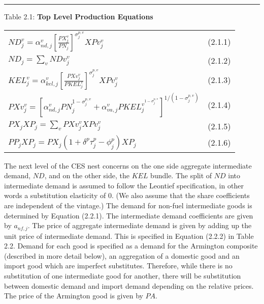 \documentclass{article}
\begin{document}
\noindent\rule{\linewidth}{0.4pt}
\begin{center}
\begin{large}

{\centering Table 2.1: \textbf{Top Level Production Equations} \par}

\begin{tabular}{>{\raggedright}p{} l}

    $N\!D_j^v=\alpha^v_{nd,j}\left[\frac{P\!X_j^v}{P\!N_j}\right]^{\sigma^{p,v}_j} X\!Pv^v_j$ & (2.1.1) \\[10pt]
    $N\!D_j=\displaystyle \sum_{v} N\!Dv_j^v$ & (2.1.2) \\
    $K\!EL^v_j = \alpha^v_{kel,j}\left[\frac{PXv^v_j}{PKEL^v_j}\right]^{\sigma^{p,v}_j} X\!Pv^v_j$ & (2.1.3) \\[10pt]
    {\normalsize $PXv^v_j = \left[\alpha^v_{nd,j}PN_j^{1-{\sigma_j^{p,v}}}+\alpha^v_{va,j} PKEL_j^{v^{1-{\sigma_j^{p,v}}}}\right]^{1/({1-\sigma_j^{p,v}})}$} & (2.1.4) \\[10pt]
    $P\!X_j X\!P_j = \displaystyle \sum_v P\!Xv^v_j X\!Pv^v_j$ & (2.1.5) \\[10pt]
    $P\!P_j X\!P_j = P\!X_j(1+\delta^p\tau^p_j-\phi^p_j)X\!P_j$ & (2.1.6) \\[10pt]
\hline
\end{tabular}
\end{large}
\end{center}

The next level of the CES nest concerns on the one side aggregate intermediate demand, $N\!D$, and on the other side, the $K\!EL$ bundle. The split of $N\!D$ into intermediate demand is assumed to follow the Leontief specification, in other words a substitution elasticity of 0. (We also assume that the share coefficients are independent of the vintage.) The demand for non-fuel intermediate goods is determined by Equation (2.2.1). The intermediate demand coefficients are given by $a_{nf,j}$. The price of aggregate intermediate demand is given by adding up the unit price of intermediate demand. This is specified in Equation (2.2.2) in Table 2.2. Demand for each good is specified as a demand for the Armington composite (described in more detail below), an aggregation of a domestic good and an import good which are imperfect substitutes. Therefore, while there is no substitution of one intermediate good for another, there will be substitution between domestic demand and import demand depending on the relative prices. The price of the Armington good is given by $P\!A$.
\end{document}
